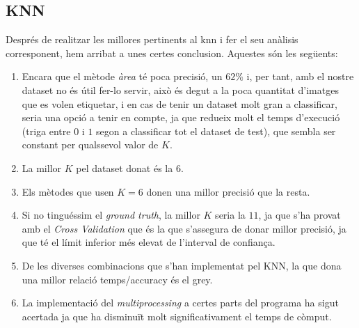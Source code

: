 \documentclass[a4paper, 11pt]{article}
\begin{document}
\subsection{KNN}
Després de realitzar les millores pertinents al knn i fer el seu anàlisis corresponent,  hem arribat a unes certes conclusion. Aquestes són les següents:
\begin{enumerate}
    \item Encara que el mètode \textit{àrea} té poca precisió, un $62\%$ i, per tant, amb el nostre dataset no és útil fer-lo servir, això és degut a la poca quantitat d'imatges que es volen etiquetar, i en cas de tenir un dataset molt gran a classificar, seria una opció a tenir en compte, ja que redueix molt el temps d'execució (triga entre $0$ i $1$ segon a classificar tot el dataset de test), que sembla ser constant per qualssevol valor de $K$.
    \item La millor $K$ pel dataset donat és la $6$.
    \item Els mètodes que usen $K=6$ donen una millor precisió que la resta.
    \item Si no tinguéssim el \textit{ground truth}, la millor $K$ seria la $11$, ja que s'ha provat amb el \textit{Cross Validation} que és la que s'assegura de donar millor precisió, ja que té el límit inferior més elevat de l'interval de confiança.
    \item De les diverses combinacions que s'han implementat pel KNN, la que dona una millor relació temps/accuracy és el grey.
    \item La implementació del \textit{multiprocessing} a certes parts del programa ha sigut acertada ja que ha disminuït molt significativament el temps de còmput.
\end{enumerate}
\end{document}
